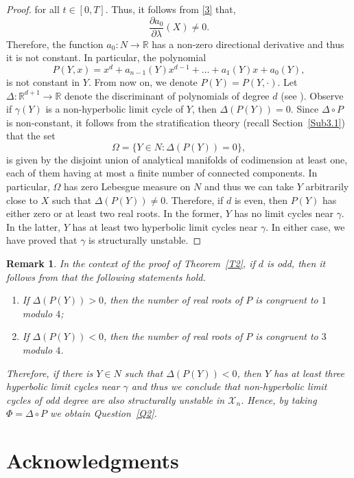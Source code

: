 \documentclass[11pt]{amsart}
\newtheorem{remark}{Remark}
\begin{document}
\begin{proof}
for all $t\in[0,T]$. Thus, it follows from \eqref{3} that,
	\[\frac{\partial a_0}{\partial\lambda}(X)\neq0.\]
Therefore, the function $a_0\colon N\to\mathbb{R}$ has a non-zero directional derivative and thus it is not constant. In particular, the polynomial
	\[P(Y,x)=x^d+a_{n-1}(Y)x^{d-1}+\dots+a_1(Y)x+a_0(Y),\]
is not constant in $Y$. From now on, we denote $P(Y)=P(Y,\cdot)$. Let $\Delta\colon\mathbb{R}^{d+1}\to\mathbb{R}$ denote the discriminant of polynomials of degree $d$ (see \cite[Chapter $12$]{GelKapZel1994}). Observe if $\gamma(Y)$ is a non-hyperbolic limit cycle of $Y$, then $\Delta(P(Y))=0$. Since $\Delta\circ P$ is non-constant, it follows from the stratification theory (recall Section~\ref{Sub3.1}) that the set 
	\[\Omega=\{Y\in N\colon \Delta(P(Y))=0\},\]
is given by the disjoint union of analytical manifolds of codimension at least one, each of them having at most a finite number of connected components. In particular, $\Omega$ has zero Lebesgue measure on $N$ and thus we can take $Y$ arbitrarily close to $X$ such that $\Delta(P(Y))\neq0$. Therefore, if $d$ is even, then $P(Y)$ has either zero or at least two real roots. In the former, $Y$ has no limit cycles near $\gamma$. In the latter, $Y$ has at least two hyperbolic limit cycles near $\gamma$. In either case, we have proved that $\gamma$ is structurally unstable. \end{proof}

\begin{remark}\label{Remark1}
	In the context of the proof of Theorem~\ref{T2}, if $d$ is odd, then it follows from \cite[Section $4$]{NickDye} that the following statements hold.
	\begin{enumerate}[label=(\roman*)]
		\item If $\Delta(P(Y))>0$, then the number of real roots of $P$ is congruent to $1$ modulo $4$;
		\item If $\Delta(P(Y))<0$, then the number of real roots of $P$ is congruent to $3$ modulo $4$.
	\end{enumerate}
	Therefore, if there is $Y\in N$ such that $\Delta(P(Y))<0$, then $Y$ has at least three hyperbolic limit cycles near $\gamma$ and thus we conclude that non-hyperbolic limit cycles of odd degree are also structurally unstable in $\mathcal{X}_n$. Hence, by taking $\Phi=\Delta\circ P$ we obtain Question~\ref{Q2}.
\end{remark}

\section*{Acknowledgments}
\end{document}
